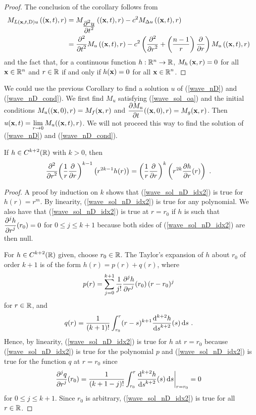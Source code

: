 \begin{proof}
The conclusion of the corollary follows from
\begin{align*}
M_{L(\VEC{x},t,\diff)u}\left((\VEC{x},t), r\right) &=
M_{\pdydxn{u}{t}{2}}\left((\VEC{x},t), r\right)
-c^2  M_{\Delta u} \left((\VEC{x},t), r\right) \\
&= \pdfdxn{M_u\left((\VEC{x},t), r\right)}{t}{2}
- c^2 \left( \pdydxn{}{r}{2} + \left(\frac{n-1}{r}\right) \pdydx{}{r} \right)
M_u\left((\VEC{x},t), r\right)
\end{align*}
and the fact that, for a continuous function $h:\RR^n\rightarrow \RR$,
$\displaystyle M_h\left(\VEC{x}, r\right) = 0$ for all
$\VEC{x}\in\RR^n$ and $r \in \RR$ if and only if
$h(\VEC{x}) = 0$ for all $\displaystyle \VEC{x}\in\RR^n$.
\end{proof}

\begin{rmk}
We could use the previous Corollary to find a solution $u$ of
(\ref{wave_nD}) and (\ref{wave_nD_cond}).  We first find
$M_u$ satisfying (\ref{wave_sol_oa}) and the initial
conditions $M_u( (\VEC{x},0), r) = M_f(\VEC{x},r)$ and
$\displaystyle \pdydx{M_u}{t}((\VEC{x},0), r) = M_g(\VEC{x},r)$.
Then
$\displaystyle u(\VEC{x},t) = \lim_{r\rightarrow 0} M_u( (\VEC{x},t), r)$.
We will not proceed this way to find the solution of (\ref{wave_nD})
and (\ref{wave_nD_cond}).
\label{wave_sol_limit}
\end{rmk}

\begin{lemma}
If $\displaystyle h \in C^{k+2}(\RR)$ with $k>0$, then
\begin{equation} \label{wave_sol_nD_idx2}
\pdfdxn{\left( \frac{1}{r} \pdydx{}{r}\right)^{k-1}}{r}{2}
\left(r^{2k-1} h(r)\right) = \left(\frac{1}{r} \pdydx{}{r}\right)^k
\left( r^{2k} \pdydx{h}{r}(r)\right) \  .
\end{equation}
\end{lemma}

\begin{proof}
A proof by induction on $k$ shows that (\ref{wave_sol_nD_idx2}) is true for
$\displaystyle h(r) = r^m$.  By linearity, (\ref{wave_sol_nD_idx2}) is true for
any polynomial.  We also have that (\ref{wave_sol_nD_idx2}) is
true at $r=r_0$ if $h$ is such that
$\displaystyle \pdydxn{h}{r}{j}(r_0) = 0$ for $0\leq j \leq k+1$ because
both sides of (\ref{wave_sol_nD_idx2}) are then null.

For $\displaystyle h \in C^{k+2}(\RR)$ given, choose $r_0 \in \RR$.
The Taylor's expansion of $h$ about $r_0$ of order $k+1$ is of
the form $\displaystyle h(r) = p(r) + q(r)$, where
\[
p(r) = \sum_{j=0}^{k+1} \frac{1}{j!}\pdydxn{h}{r}{j}(r_0) \, (r-r_0)^j
\]
for $r \in \RR$, and
\[
q(r) = \frac{1}{(k+1)!} \int_{r_0}^r (r-s)^{k+1} \dydxn{h}{s}{k+2}(s)
\dx{s} \ .
\]
Hence, by linearity, (\ref{wave_sol_nD_idx2}) is true for $h$ at
$r=r_0$ because (\ref{wave_sol_nD_idx2}) is true for the polynomial
$p$ and (\ref{wave_sol_nD_idx2}) is true for the function $q$ at
$r=r_0$ since
\[
\pdydxn{q}{r}{j}(r_0) = \frac{1}{(k+1-j)!} \int_{r_0}^r
\dydxn{h}{s}{k+2}(s) \dx{s}\bigg|_{r=r_0} = 0
\]
for $0\leq j \leq k+1$.  Since $r_0$ is arbitrary,
(\ref{wave_sol_nD_idx2}) is true for all $r\in \RR$.
\end{proof}

